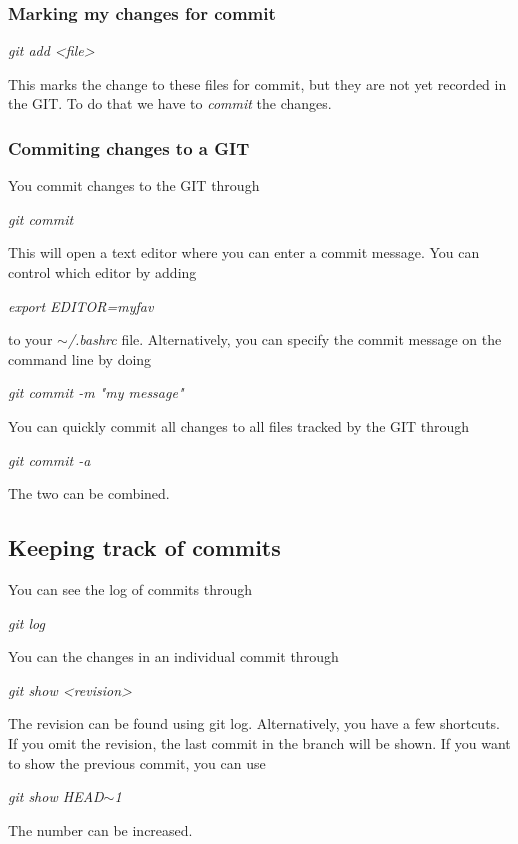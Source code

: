 \documentclass[twoside, 11pt, a4paper]{article}
\begin{document}
\subsubsection*{Marking my changes for commit}
\begin{center}\emph{git add <file>}\end{center}
This marks the change to these files for commit, 
but they are not yet recorded in the GIT. To do that we have
to \emph{commit} the changes.
\subsubsection*{Commiting changes to a GIT}
You commit changes to the GIT through \\
\begin{center}\emph{git commit}\end{center}
This will open a text editor where you can enter a commit message.
You can control which editor by adding \\
\begin{center}\emph{export EDITOR=myfav}\end{center}
to your \emph{$\sim$/.bashrc} file. Alternatively, you can specify the
commit message on the command line by doing
\begin{center}\emph{git commit -m "my message"}\end{center}
You can quickly commit all changes to all files tracked by
the GIT through \\
\begin{center}\emph{git commit -a}\end{center}
The two can be combined.
\subsection*{Keeping track of commits}
You can see the log of commits through
\begin{center}\emph{git log}\end{center}
You can the changes in an individual commit through
\begin{center}\emph{git show <revision>}\end{center}
The revision can be found using git log. Alternatively, you
have a few shortcuts. If you omit the revision, the last commit
in the branch will be shown. If you want to show the previous commit,
you can use
\begin{center}\emph{git show HEAD$\sim$1}\end{center}
The number can be increased.
\end{document}
